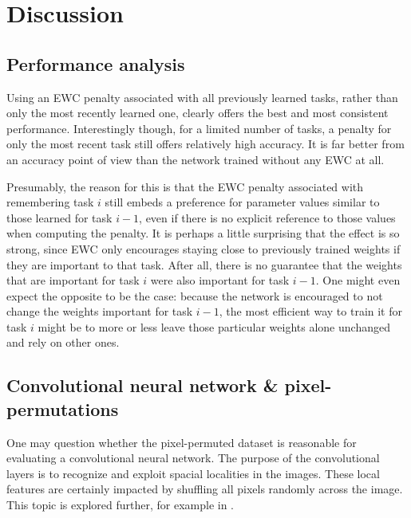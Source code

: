 \documentclass{article}
\begin{document}
    \section*{Discussion}
        \subsection*{Performance analysis}
            Using an EWC penalty associated with all previously learned 
            tasks, rather than only the most recently learned one, clearly offers 
            the best and most consistent performance. Interestingly though, for 
            a limited number of tasks, a penalty for only the most recent task 
            still offers relatively high accuracy. It is far better from an 
            accuracy point of view than the network trained without any EWC at all.

            Presumably, the reason for this is that the EWC penalty associated 
            with remembering task $i$ still embeds a preference for parameter 
            values similar to those learned for task $i-1$, even if there is no 
            explicit reference to those values when computing the penalty. 
            It is perhaps a little surprising that the effect is so strong, 
            since EWC only encourages staying close to previously trained weights
            if they are important to that task. After all, there is no guarantee that 
            the weights that are important for task $i$ were also important for 
            task $i-1$. One might even expect the opposite to be the case: 
            because the network is encouraged to not change the weights 
            important for task $i-1$, the most efficient way to train it for 
            task $i$ might be to more or less leave those particular weights alone 
            unchanged and rely on other ones.

        \subsection*{Convolutional neural network \& pixel-permutations}
            One may question whether the pixel-permuted dataset is reasonable
            for evaluating a convolutional neural network. The purpose of the 
            convolutional layers is to recognize and exploit spacial localities 
            in the images. These local features are certainly impacted by shuffling 
            all pixels randomly across the image. This topic is explored further,
            for example in \cite{ivan2019convolutional}.
            
\end{document}
